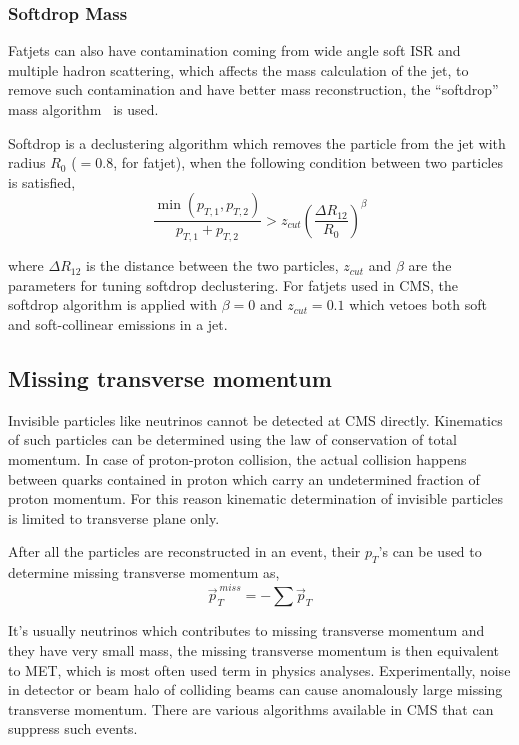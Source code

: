 \subsubsection{
  Softdrop Mass
}\label{ch_reco:softdrop}

Fatjets can also have contamination coming from wide angle
soft \gls{ISR} and multiple hadron scattering,
which affects the mass calculation of the jet, to remove
such contamination and have better mass reconstruction, the
``softdrop'' mass algorithm~\cite{softdrop-mass-2014} is used.

Softdrop is a declustering algorithm which removes the particle from the jet
with radius \( R_0 \) (\(=0.8\), for fatjet), when the following condition between two particles is satisfied,
%
\begin{equation}
  \frac{\min(p_{T,1}, p_{T,2})}{p_{T,1} + p_{T,2}} > z_{cut} {\left( \frac{\Delta R_{12}}{R_0} \right)}^{\beta}
\end{equation}

where \( \Delta R_{12} \) is the distance between the two particles, \( z_{cut} \)
and \( \beta \) are the parameters for tuning softdrop declustering.
For fatjets used in \gls{CMS}, the softdrop algorithm is applied with
\( \beta = 0\) and \( z_{cut} = 0.1\) which vetoes both soft
and soft-collinear emissions in a jet.

\subsection{
  Missing transverse momentum
}

Invisible particles like neutrinos cannot be detected at \gls{CMS} directly.
Kinematics of such particles can be determined using the law of conservation of
total momentum. In case of proton-proton collision,
the actual collision happens between quarks contained in
proton which carry an undetermined fraction of proton momentum.
For this reason kinematic determination
of invisible particles is limited to transverse plane only.

After all the particles are reconstructed in an event, their \( p_T \)'s
can be used to determine missing transverse momentum as,
%
\begin{equation}
  \vec{p}_{T}^{~miss} = - \sum \vec{p}_{T}
\end{equation}

It's usually neutrinos which contributes to missing transverse momentum
and they have very small mass, the missing transverse momentum is then
equivalent to \gls{MET}, which is most often used term in physics analyses.
Experimentally, noise in detector or beam halo of colliding beams
can cause anomalously large missing transverse momentum. There are
various algorithms available in \gls{CMS} that can suppress such events.

